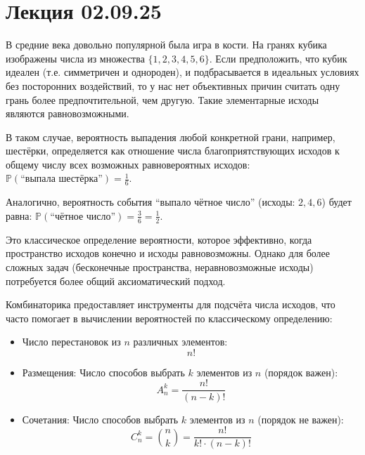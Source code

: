 \documentclass[12pt,a4paper]{article}
\begin{document}

\tableofcontents
\newpage

\section{Лекция 02.09.25}
В средние века довольно популярной была игра в кости. На гранях кубика изображены числа из множества $\{1, 2, 3, 4, 5, 6\}$. Если предположить, что кубик идеален (т.е. симметричен и однороден), и подбрасывается в идеальных условиях без посторонних воздействий, то у нас нет объективных причин считать одну грань более предпочтительной, чем другую. Такие элементарные исходы являются равновозможными.

В таком случае, вероятность выпадения любой конкретной грани, например, шестёрки, определяется как отношение числа благоприятствующих исходов к общему числу всех возможных равновероятных исходов: $\mathbb{P}(\text{``выпала шестёрка''}) = \frac{1}{6}.$

Аналогично, вероятность события ``выпало чётное число'' (исходы: $2, 4, 6$) будет равна: $\mathbb{P}(\text{``чётное число''}) = \frac{3}{6} = \frac{1}{2}.$

Это классическое определение вероятности, которое эффективно, когда пространство исходов конечно и исходы равновозможны. Однако для более сложных задач (бесконечные пространства, неравновозможные исходы) потребуется более общий аксиоматический подход.

\begin{remind}
Комбинаторика предоставляет инструменты для подсчёта числа исходов, что часто помогает в вычислении вероятностей по классическому определению:
\begin{itemize}
    \item Число перестановок из $n$ различных элементов: $$n!$$
    \item Размещения: Число способов выбрать $k$ элементов из $n$ (порядок важен): $$A_n^k = \frac{n!}{(n-k)!}$$
    \item Сочетания: Число способов выбрать $k$ элементов из $n$ (порядок не важен): $$C_n^k = \binom{n}{k} = \frac{n!}{k! \cdot (n-k)!}$$
\end{itemize}
\end{remind}
\end{document}
